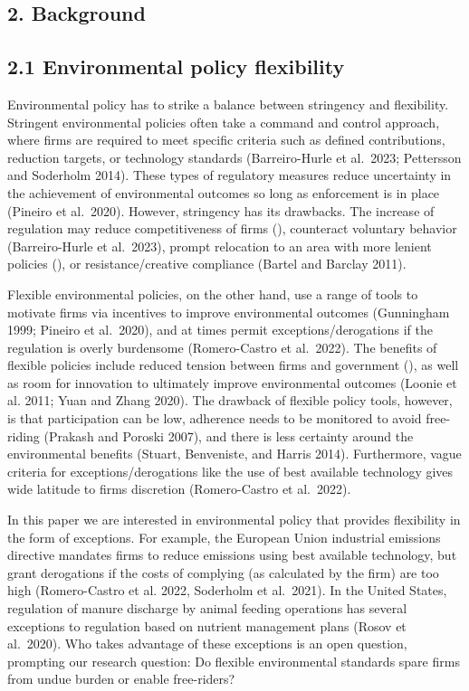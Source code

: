 \documentclass[twoside,12pt,final]{ucthesis-CA2012}
\begin{document}
\begin{ucmainmatter}
\hypertarget{background}{%
\section{2. Background}\label{background}}

\hypertarget{environmental-policy-flexibility}{%
\subsection{2.1 Environmental policy flexibility}\label{environmental-policy-flexibility}}

Environmental policy has to strike a balance between stringency and
flexibility. Stringent environmental policies often take a command and
control approach, where firms are required to meet specific criteria
such as defined contributions, reduction targets, or technology
standards (Barreiro-Hurle et al.~2023; Pettersson and Soderholm 2014).
These types of regulatory measures reduce uncertainty in the achievement
of environmental outcomes so long as enforcement is in place (Pineiro et
al.~2020). However, stringency has its drawbacks. The increase of
regulation may reduce competitiveness of firms (), counteract voluntary
behavior (Barreiro-Hurle et al.~2023), prompt relocation to an area with
more lenient policies (), or resistance/creative compliance (Bartel and
Barclay 2011).

Flexible environmental policies, on the other hand, use a range of tools
to motivate firms via incentives to improve environmental outcomes
(Gunningham 1999; Pineiro et al.~2020), and at times permit
exceptions/derogations if the regulation is overly burdensome
(Romero-Castro et al.~2022). The benefits of flexible policies include
reduced tension between firms and government (), as well as room for
innovation to ultimately improve environmental outcomes (Loonie et al.
2011; Yuan and Zhang 2020). The drawback of flexible policy tools,
however, is that participation can be low, adherence needs to be
monitored to avoid free-riding (Prakash and Poroski 2007), and there is
less certainty around the environmental benefits (Stuart, Benveniste,
and Harris 2014).
Furthermore, vague criteria for exceptions/derogations like the use of
\textquotesingle best available technology\textquotesingle{} gives wide latitude to firms\textquotesingle{} discretion
(Romero-Castro et al.~2022).

In this paper we are interested in environmental policy that provides
flexibility in the form of exceptions. For example, the European Union
industrial emissions directive mandates firms to reduce emissions using
\textquotesingle best available technology\textquotesingle, but grant derogations if the costs of
complying (as calculated by the firm) are too high (Romero-Castro et al.
2022, Soderholm et al.~2021). In the United States, regulation of manure
discharge by animal feeding operations has several exceptions to
regulation based on nutrient management plans (Rosov et al.~2020). Who
takes advantage of these exceptions is an open question, prompting our
research question: Do flexible environmental standards spare firms from
undue burden or enable free-riders?


\end{ucmainmatter}
\end{document}
